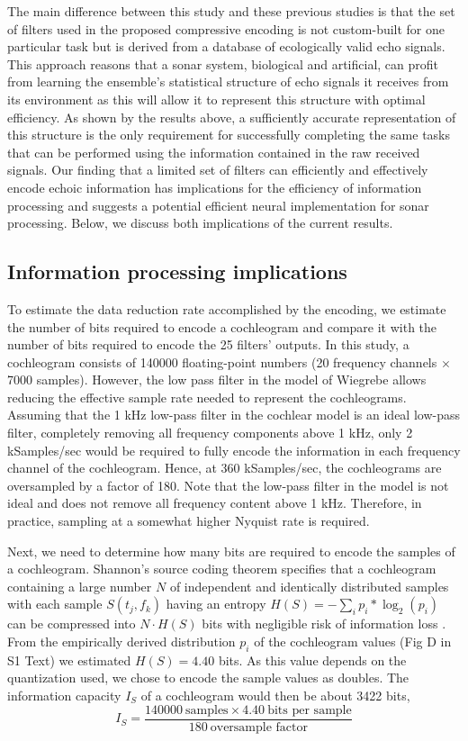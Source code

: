 \documentclass[10pt,letterpaper]{article}
\begin{document}
The main difference between this study and these previous studies is that the set of filters used in the proposed compressive encoding is not custom-built for one particular task but is derived from a database of ecologically valid echo signals. This approach reasons that a sonar system, biological and artificial, can profit from learning the ensemble's statistical structure of echo signals it receives from its environment as this will allow it to represent this structure with optimal efficiency. As shown by the results above, a sufficiently accurate representation of this structure is the only requirement for successfully completing the same tasks that can be performed using the information contained in the raw received signals. Our finding that a limited set of filters can efficiently and effectively encode echoic information has implications for the efficiency of information processing and suggests a potential efficient neural implementation for sonar processing. Below, we discuss both implications of the current results.

\subsection*{Information processing implications}

To estimate the data reduction rate accomplished by the encoding, we estimate the number of bits required to encode a cochleogram and compare it with the number of bits required to encode the 25 filters' outputs. In this study, a cochleogram consists of 140000 floating-point numbers (20 frequency channels $\times$ 7000 samples). However, the low pass filter in the model of Wiegrebe \cite{Wiegrebe2008} allows reducing the effective sample rate needed to represent the cochleograms. Assuming that the 1 kHz low-pass filter in the cochlear model is an ideal low-pass filter, completely removing all frequency components above 1 kHz, only 2 kSamples/sec would be required to fully encode the information in each frequency channel of the cochleogram. Hence, at 360 kSamples/sec, the cochleograms are oversampled by a factor of 180. Note that the low-pass filter in the model is not ideal and does not remove all frequency content above 1 kHz. Therefore, in practice, sampling at a somewhat higher Nyquist rate is required. 

Next, we need to determine how many bits are required to encode the samples of a cochleogram. Shannon's source coding theorem specifies that a cochleogram containing a large number $N$ of independent and identically distributed samples with each sample $S(t_j,f_k)$ having an entropy $H(S)=-\sum _i p_i*\log_2 (p_i)$ can be compressed into $N \cdot H(S)$ bits with negligible risk of information loss \cite{Mackay2003}. From the empirically derived distribution $p_i$ of the cochleogram values (Fig D in S1 Text) we estimated $H(S)=4.40$ bits. As this value depends on the quantization used, we chose to encode the sample values as doubles. The information capacity $I_S$ of a cochleogram would then be about 3422 bits,
\begin{equation}
I_S = \frac{140000\ \mbox{samples} \times 4.40\ \mbox{bits per sample}}{180\ \mbox{oversample factor}}
\end{equation}
\end{document}
